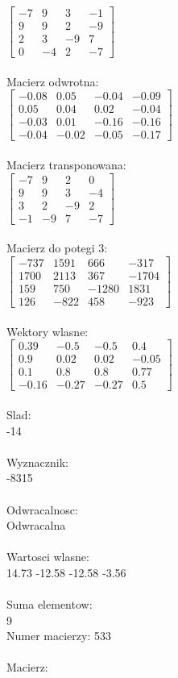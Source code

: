\documentclass[a4paper,12pt]{article}
\begin{document}
$\begin{bmatrix} -7&9&3&-1\\9&9&2&-9\\2&3&-9&7\\0&-4&2&-7 \end{bmatrix}$
\\
\\
Macierz odwrotna:\\

$\begin{bmatrix} -0.08&0.05&-0.04&-0.09\\0.05&0.04&0.02&-0.04\\-0.03&0.01&-0.16&-0.16\\-0.04&-0.02&-0.05&-0.17 \end{bmatrix}$
\\
\\
Macierz transponowana:\\

$\begin{bmatrix} -7&9&2&0\\9&9&3&-4\\3&2&-9&2\\-1&-9&7&-7 \end{bmatrix}$
\\
\\
Macierz do potegi 3:\\

$\begin{bmatrix} -737&1591&666&-317\\1700&2113&367&-1704\\159&750&-1280&1831\\126&-822&458&-923 \end{bmatrix}$
\\
\\
Wektory wlasne:\\

$\begin{bmatrix} 0.39&-0.5&-0.5&0.4\\0.9&0.02&0.02&-0.05\\0.1&0.8&0.8&0.77\\-0.16&-0.27&-0.27&0.5 \end{bmatrix}$
\\
\\
Slad:\\
-14
\\
\\
Wyznacznik:\\
-8315
\\
\\
Odwracalnosc:\\
Odwracalna
\\
\\
Wartosci wlasne:\\
14.73 -12.58 -12.58 -3.56
\\
\\
Suma elementow:\\
9
\\
\newpage
Numer macierzy:
533
\\
\\
Macierz:\\
\end{document}

